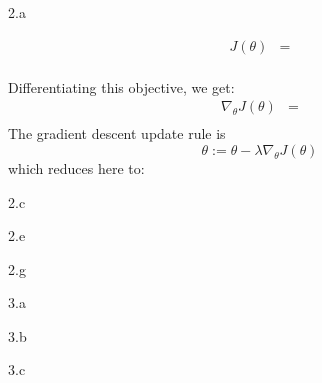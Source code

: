 \LARGE
2.a
\normalsize

\begin{answer}
  
  \begin{align*}
      J(\theta)&=\\
  \end{align*}

  Differentiating this objective, we get:
  \begin{align*}
      \nabla_{\theta} J(\theta)&=\\
  \end{align*}
  The gradient descent update rule is
  \begin{equation*}
  \theta := \theta - \lambda \nabla_{\theta} J(\theta)
  \end{equation*}
  which reduces here to:
\end{answer}
\clearpage

\LARGE
2.c
\normalsize

\begin{answer}
\end{answer}
\clearpage

\LARGE
2.e
\normalsize

\begin{answer}
\end{answer}
\clearpage

\LARGE
2.g
\normalsize

\begin{answer}
\end{answer}
\clearpage

\LARGE
3.a
\normalsize

\begin{answer}
\end{answer}

\LARGE
3.b
\normalsize

\begin{answer}
\end{answer}

\LARGE
3.c
\normalsize

\begin{answer}
\end{answer}


